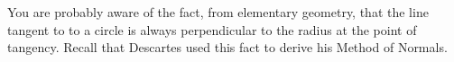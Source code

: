 \begin{ProblemSection}





\begin{embeddedproblem}{}
  You are probably aware of the fact, from elementary geometry, that
  the line tangent to to a circle is always perpendicular to the
  radius at the point of tangency. Recall that Descartes used this
  fact to derive his Method of Normals.


\end{embeddedproblem}
\end{ProblemSection}
